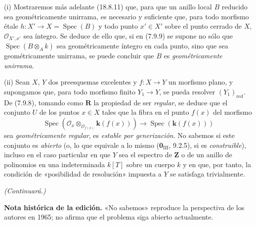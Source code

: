 \begin{remarks}[7.9.10]
\label{IV.2.s7.9.10-fr}
(i) Mostraremos más adelante (18.8.11) que, para que un anillo local $B$ reducido
sea geométricamente unirrama, es necesario y suficiente que, para todo morfismo
étale $h:X'\to X=\operatorname{Spec}(B)$ y todo punto $x'\in X'$ sobre
el punto cerrado de $X$, $\mathcal O_{X',x'}$ sea íntegro. Se deduce de ello que, si
en (7.9.9) se supone no sólo que
$\operatorname{Spec}(B\otimes_Ak)$ sea geométricamente íntegro
en cada punto, sino que sea geométricamente unirrama, se puede concluir que $B$ es
\emph{geométricamente unirrama}.


(ii) Sean $X$, $Y$ dos preesquemas excelentes y $f:X\to Y$ un morfismo
plano, y supongamos que, para todo morfismo finito $Y_1\to Y$, se pueda resolver
$(Y_1)_{\mathrm{red}}$. De (7.9.8), tomando como
$\boldsymbol R$ la propiedad de ser \emph{regular}, se deduce que el conjunto $U$ de los puntos
$x\in X$ tales que la fibra en el punto $f(x)$ del morfismo
\[
\operatorname{Spec}(\mathcal O_x\otimes_{\mathcal O_{f(x)}}\boldsymbol{k}(f(x)))
\longrightarrow\operatorname{Spec}(\boldsymbol{k}(f(x)))
\]
sea \emph{geométricamente regular}, es \emph{estable por generización}. No sabemos si
este conjunto es \emph{abierto} (o, lo que equivale a lo mismo (\textbf 0$_{\mathrm{III}}$,
9.2.5), si es \emph{construible}), incluso en el caso particular en que $Y$ sea el
espectro de $\mathbf Z$ o de un anillo de polinomios en una indeterminada $k[T]$
sobre un cuerpo $k$ y en que, por tanto, la condición de «posibilidad de resolución» impuesta a
$Y$ se satisfaga trivialmente.
\end{remarks}

\begin{center}
\emph{(Continuará.)}
\end{center}

\par\smallskip
{\small\noindent\textbf{Nota histórica de la edición.}
«No sabemos» reproduce la perspectiva de los autores en 1965; no afirma que el problema siga abierto actualmente.}\par
